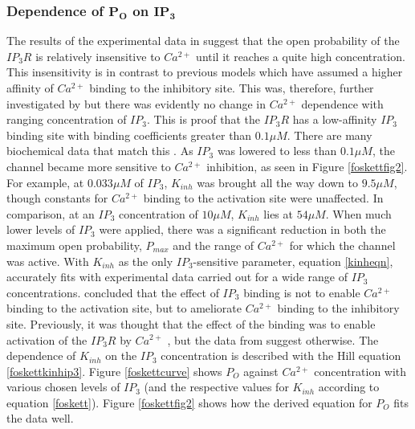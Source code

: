 \subsubsection*{Dependence of $\mathbf{P_O}$ on $\mathbf{IP_3}$}
The results of the experimental data in  suggest that the open probability of the $IP_3R$ is relatively insensitive to $Ca^{2+}$ until it reaches a quite high concentration. This insensitivity is in contrast to previous models which have assumed a higher affinity of $Ca^{2+}$ binding to the inhibitory site. This was, therefore, further investigated by  but there was evidently no change in $Ca^{2+}$ dependence with ranging concentration of $IP_3$. This is proof that the $IP_3R$ has a low-affinity $IP_3$ binding site with binding coefficients  greater than $0.1 \mu M$. There are many biochemical data that match this . As $IP_3$ was lowered to less than $0.1\mu M$, the channel became more sensitive to $Ca^{2+}$ inhibition, as seen in Figure \ref{foskettfig2}. For example, at $0.033 \mu M$ of $IP_3$, $K_{inh}$ was brought all the way down to $9.5 \mu M$, though constants for $Ca^{2+}$ binding to the activation site were unaffected. In comparison, at an $IP_3$ concentration of $10\mu M$, $K_{inh}$ lies at $54 \mu M$. When much lower levels of $IP_3$ were applied, there was a significant reduction in both the maximum open probability, $P_{max}$ and the range of $Ca^{2+}$ for which the channel was active. With $K_{inh}$ as the only $IP_3$-sensitive parameter, equation \eqref{kinheqn}, accurately fits with experimental data carried out for a wide range of $IP_3$ concentrations.  concluded that the effect of $IP_3$ binding is not to enable $Ca^{2+}$ binding to the activation site, but to ameliorate $Ca^{2+}$ binding to the inhibitory site. Previously, it was thought that the effect of the binding was to enable activation of the $IP_3R$ by $Ca^{2+}$ , but the data from  suggest otherwise. The dependence of $K_{inh}$ on the $IP_3$ concentration is described with the Hill equation \eqref{foskettkinhip3}. Figure \ref{foskettcurve} shows $P_O$ against $Ca^{2+}$ concentration with various chosen levels of $IP_3$ (and the respective values for $K_{inh}$ according to equation \eqref{foskett}). Figure \ref{foskettfig2} shows how the derived equation for $P_O$ fits the data well. 
